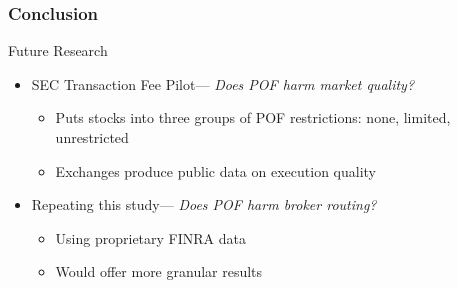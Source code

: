 \documentclass[11pt]{beamer}
\begin{document}
\begin{frame}
\frametitle{Conclusion}

\begin{block}
	{Future Research}
	\begin{itemize}
		\setlength\itemsep{0.4em}
		\item SEC Transaction Fee Pilot--- \textit{Does POF harm market quality?}
		\begin{itemize}
			\setlength\itemsep{0.4em}
			\vspace{0.2em}
			\item Puts stocks into three groups of POF restrictions: none, limited, unrestricted
			\item Exchanges produce public data on execution quality
		\end{itemize}
		\item Repeating this study--- \textit{Does POF harm broker routing?}
		\begin{itemize}
			\setlength\itemsep{0.4em}
			\vspace{0.2em}
			\item Using proprietary FINRA data 
			\item Would offer more granular results
		\end{itemize}
	\end{itemize}
\end{block}

\end{frame}
\end{document}
